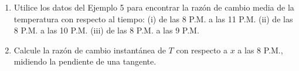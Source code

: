 \item 
    \begin{enumerate}
        \item Utilice los datos del Ejemplo 5 para encontrar la razón de cambio media de la temperatura con respecto al tiempo:
        (i) de las 8 P.M. a las 11 P.M.
        (ii) de las 8 P.M. a las 10 P.M.
        (iii) de las 8 P.M. a las 9 P.M.
        \item Calcule la razón de cambio instantánea de $T$ con respecto a $x$ a las 8 P.M., midiendo la pendiente de una tangente.
    \end{enumerate}
